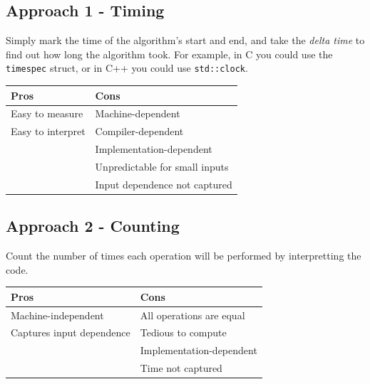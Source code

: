 \documentclass[12pt, letterpaper]{article}
\begin{document}
\subsection*{Approach 1 - Timing}

Simply mark the time of the algorithm's start and end, and take the \textit{delta time} to find out how long the algorithm took. For example, in C you could use the \texttt{timespec} struct, or in C++ you could use \texttt{std::clock}.

\begin{center}
\begin{tabular}{|l|l|}
\hline
\textbf{Pros}     & \textbf{Cons}                                     \\ \hline
Easy to measure   & Machine-dependent                                 \\ \hline
Easy to interpret & Compiler-dependent                                \\ \hline
                  & Implementation-dependent                          \\ \hline
                  & Unpredictable for small inputs                    \\ \hline
                  & Input dependence not captured                     \\ \hline
\end{tabular}
\end{center}

\subsection*{Approach 2 - Counting}

Count the number of times each operation will be performed by interpretting the code.

\begin{center}
\begin{tabular}{|l|l|}
\hline
\textbf{Pros}               & \textbf{Cons}                         \\ \hline
Machine-independent         & All operations are equal              \\ \hline
Captures input dependence   & Tedious to compute                    \\ \hline
                            & Implementation-dependent              \\ \hline
                            & Time not captured                     \\ \hline
\end{tabular}
\end{center}
\end{document}
